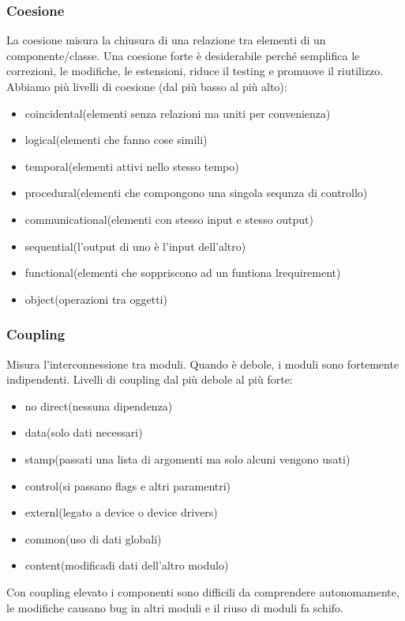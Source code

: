 \documentclass{article}
\begin{document}
\subsubsection{Coesione}
La coesione misura la chiusura di una relazione tra elementi di un componente/classe. Una coesione forte
è desiderabile perché semplifica le correzioni, le modifiche, le estensioni, riduce il testing e promuove il
riutilizzo. Abbiamo più livelli di coesione (dal più basso al più alto):
\begin{itemize}
    \item coincidental(elementi senza relazioni ma uniti per convenienza)
    \item logical(elementi che fanno cose simili)
    \item temporal(elementi attivi nello stesso tempo)
    \item procedural(elementi che compongono una singola sequnza di controllo)
    \item communicational(elementi con stesso input e stesso output)
    \item sequential(l'output di uno è l'input dell'altro)
    \item functional(elementi che soppriscono ad un funtiona lrequirement)
    \item object(operazioni tra oggetti)
\end{itemize}

\subsubsection{Coupling}

Misura l'interconnessione tra moduli. Quando è debole, i moduli sono fortemente indipendenti. Livelli di
coupling dal più debole al più forte:
\begin{itemize}
    \item no direct(nessuna dipendenza)
    \item data(solo dati necessari)
    \item stamp(passati una lista di argomenti ma solo alcuni vengono usati)
    \item control(si passano flags e altri paramentri)
    \item externl(legato a device o device drivers)
    \item common(uso di dati globali)
    \item content(modificadi dati dell'altro modulo)
\end{itemize}

Con coupling elevato i componenti sono difficili da comprendere autonomamente,
le modifiche causano bug in altri moduli e il riuso di moduli fa schifo.
\end{document}
